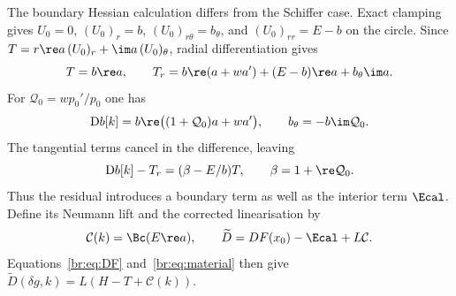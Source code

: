 The boundary Hessian calculation differs from the Schiffer case.
Exact clamping gives $U_0=0$, $(U_0)_r=b$, $(U_0)_{r\theta}=b_\theta$,
and $(U_0)_{rr}=E-b$ on the circle. Since
$T=r\re a\,(U_0)_r+\im a\,(U_0)_\theta$, radial differentiation gives
\begin{equation}\label{br:eq:T-boundary}
 T=b\re a,\qquad
 T_r=b\re(a+wa')+(E-b)\re a+b_\theta\im a.
\end{equation}
For $\mathcal Q_0=wp_0'/p_0$ one has
\[
 \mathrm Db[k]=b\re\bigl((1+\mathcal Q_0)a+wa'\bigr),\qquad
 b_\theta=-b\im \mathcal Q_0.
\]
The tangential terms cancel in the difference, leaving
\begin{equation}\label{br:eq:boundary-difference}
 \mathrm Db[k]-T_r=(\beta-E/b)T,
 \qquad \beta=1+\re \mathcal Q_0.
\end{equation}
Thus the residual introduces a boundary term as well as the interior
term $\Ecal$. Define its Neumann lift and the corrected linearisation by
\begin{equation}\label{br:eq:corrected}
 \mathcal C(k)=\Bc(E\re a),\qquad
 \widetilde D=DF(x_0)-\Ecal+L\mathcal C.
\end{equation}
Equations~\eqref{br:eq:DF} and~\eqref{br:eq:material} then give
$\widetilde D(\delta g,k)=L(H-T+\mathcal C(k))$.

